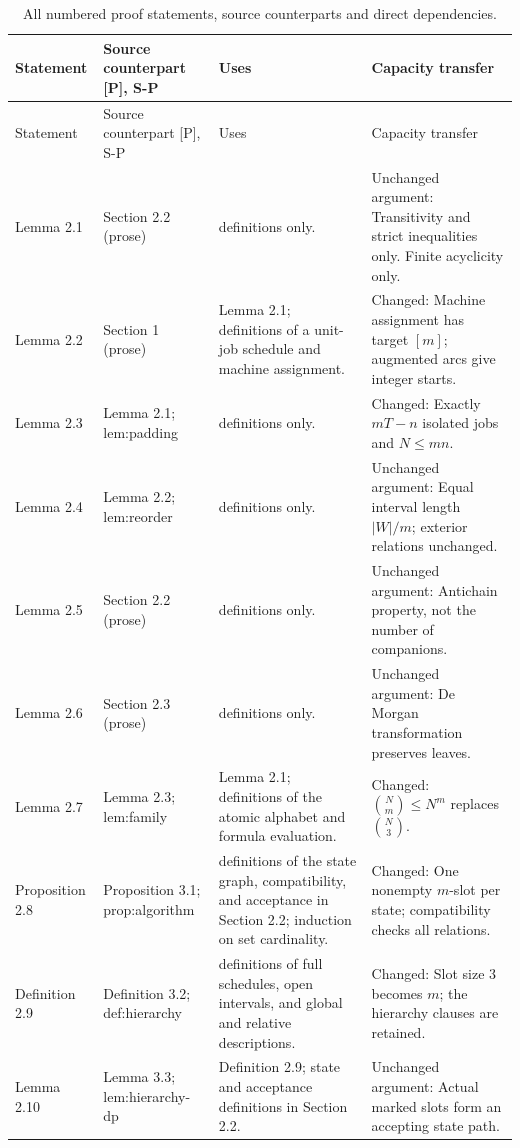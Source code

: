 {\footnotesize
\begin{longtable}{@{}L{2.6cm}L{3.2cm}L{3.7cm}L{5.1cm}@{}}
\caption{All numbered proof statements, source counterparts and direct dependencies.}\label{tab:dep}\\
\toprule Statement & Source counterpart [P], S-P & Uses & Capacity transfer\\\midrule\endfirsthead
\toprule Statement & Source counterpart [P], S-P & Uses & Capacity transfer\\\midrule\endhead
\bottomrule\endfoot
Lemma 2.1 & Section 2.2 (prose) & definitions only. & Unchanged argument: Transitivity and strict inequalities only. Finite acyclicity only.\\[3pt]
Lemma 2.2 & Section 1 (prose) & Lemma 2.1; definitions of a unit-job schedule and machine assignment. & Changed: Machine assignment has target \([m]\); augmented arcs give integer starts.\\[3pt]
Lemma 2.3 & Lemma 2.1; \textsf{lem:\allowbreak padding} & definitions only. & Changed: Exactly \(mT-n\) isolated jobs and \(N\leq mn\).\\[3pt]
Lemma 2.4 & Lemma 2.2; \textsf{lem:\allowbreak reorder} & definitions only. & Unchanged argument: Equal interval length \(|W|/m\); exterior relations unchanged.\\[3pt]
Lemma 2.5 & Section 2.2 (prose) & definitions only. & Unchanged argument: Antichain property, not the number of companions.\\[3pt]
Lemma 2.6 & Section 2.3 (prose) & definitions only. & Unchanged argument: De Morgan transformation preserves leaves.\\[3pt]
Lemma 2.7 & Lemma 2.3; \textsf{lem:\allowbreak family} & Lemma 2.1; definitions of the atomic alphabet and formula evaluation. & Changed: \(\binom Nm\leq N^m\) replaces \(\binom N3\).\\[3pt]
Proposition 2.8 & Proposition 3.1; \textsf{prop:\allowbreak algorithm} & definitions of the state graph, compatibility, and acceptance in Section 2.2; induction on set cardinality. & Changed: One nonempty \(m\)-slot per state; compatibility checks all relations.\\[3pt]
Definition 2.9 & Definition 3.2; \textsf{def:\allowbreak hierarchy} & definitions of full schedules, open intervals, and global and relative descriptions. & Changed: Slot size $3$ becomes $m$; the hierarchy clauses are retained.\\[3pt]
Lemma 2.10 & Lemma 3.3; \textsf{lem:\allowbreak hierarchy-\allowbreak dp} & Definition 2.9; state and acceptance definitions in Section 2.2. & Unchanged argument: Actual marked slots form an accepting state path.\\[3pt]

\end{longtable}}
